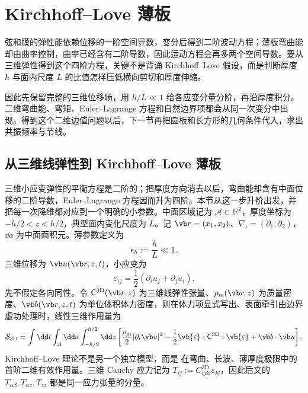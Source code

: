 \section{Kirchhoff--Love 薄板}
\label{chap:thin-plate-theory}

弦和膜的弹性能依赖位移的一阶空间导数，变分后得到二阶波动方程；薄板弯曲能却由曲率控制，曲率已经含有二阶导数，因此运动方程会再多两个空间导数。要从三维弹性得到这个四阶方程，关键不是背诵 Kirchhoff--Love 假设，而是判断厚度 $h$ 与面内尺度 $L$ 的比值怎样压低横向剪切和厚度伸缩。

因此先保留完整的三维位移场，用 $h/L\ll1$ 给各应变分量分阶，再沿厚度积分。二维弯曲能、弯矩、Euler--Lagrange 方程和自然边界项都会从同一次变分中出现。得到这个二维边值问题以后，下一节再把圆板和长方形的几何条件代入，求出共振频率与节线。
\subsection{从三维线弹性到 Kirchhoff--Love 薄板}

三维小应变弹性的平衡方程是二阶的；把厚度方向消去以后，弯曲能却含有中面位移的二阶导数，Euler--Lagrange 方程因而升为四阶。本节从这一步升阶出发，并把每一次降维都对应到一个明确的小参数。中面区域记为 \(\mathcal A\subset\mathbb R^2\)，厚度坐标为 \(-h/2<z<h/2\)，典型面内变化尺度为 \(L\)。记 \(\vb r=(x_1,x_2)\)、\(\nabla_t=(\partial_1,\partial_2)\)，\(\dd a\) 为中面面积元。薄参数定义为
\begin{equation}
 \epsilon_h:=\frac{h}{L}\ll1.
 \label{eq:phys-cont-kirchhoff-slenderness}
\end{equation}
三维位移为 \(\vb u(\vb r,z,t)\)，小应变为
\[
 \varepsilon_{ij}=\frac12(\partial_i u_j+\partial_j u_i).
\]
先不假定各向同性。令 \(\mathsf C^{3\mathrm D}(\vb r,z)\) 为三维线弹性张量、\(\rho_{\rm m}(\vb r,z)\) 为质量密度、\(\vb b(\vb r,z,t)\) 为单位体积体力密度，则在体力项显式写出、表面牵引由边界虚功处理时，线性三维作用量为
\begin{equation}
 \mathcal S_{3\mathrm D}
 =\int\dd t\int_{\mathcal A}\dd a\int_{-h/2}^{h/2}\dd z
 \left[
 \frac{\rho_{\rm m}}{2}|\partial_t\vb u|^2
 -\frac12\vb{\varepsilon}:\mathsf C^{3\mathrm D}:\vb{\varepsilon}
 +\vb b\cdot\vb u
 \right].
 \label{eq:phys-cont-3d-elastic-action}
\end{equation}
Kirchhoff--Love 理论不是另一个独立模型，而是 在弯曲、长波、薄厚度极限中的首阶二维有效作用量。三维 Cauchy 应力记为 \(T_{ij}:=C^{3\mathrm D}_{ijkl}\varepsilon_{kl}\)，因此后文的 \(T_{\alpha\beta},T_{\alpha z},T_{zz}\) 都是同一应力张量的分量。

